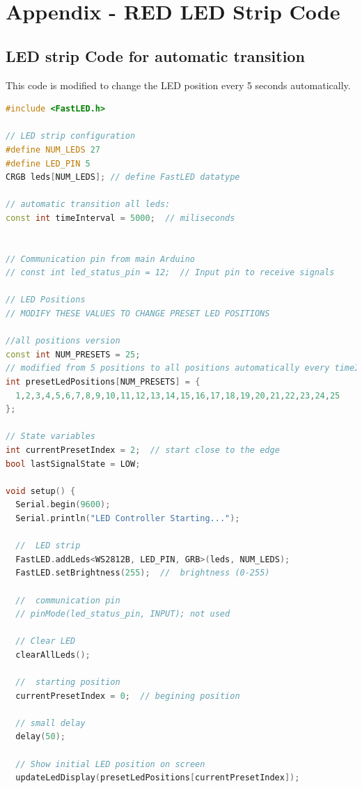 \section{Appendix - RED LED Strip Code}
\subsection{LED strip Code for automatic transition}
\label{RGBAppendix}
This code is modified to change the LED position every 5 seconds automatically.


\begin{lstlisting}[style=cstyle, caption=Cpp Code of the RGB strip with automatic changes, label=lst:RGBcodeAutomatic, language=c++ ]
    #include <FastLED.h>

// LED strip configuration
#define NUM_LEDS 27
#define LED_PIN 5
CRGB leds[NUM_LEDS]; // define FastLED datatype

// automatic transition all leds:
const int timeInterval = 5000;  // miliseconds


// Communication pin from main Arduino
// const int led_status_pin = 12;  // Input pin to receive signals

// LED Positions 
// MODIFY THESE VALUES TO CHANGE PRESET LED POSITIONS

//all positions version
const int NUM_PRESETS = 25;
// modified from 5 positions to all positions automatically every timeInterval seconds
int presetLedPositions[NUM_PRESETS] = {
  1,2,3,4,5,6,7,8,9,10,11,12,13,14,15,16,17,18,19,20,21,22,23,24,25   
};

// State variables
int currentPresetIndex = 2;  // start close to the edge
bool lastSignalState = LOW;

void setup() {
  Serial.begin(9600);
  Serial.println("LED Controller Starting...");
 
  //  LED strip
  FastLED.addLeds<WS2812B, LED_PIN, GRB>(leds, NUM_LEDS);
  FastLED.setBrightness(255);  //  brightness (0-255)
 
  //  communication pin
  // pinMode(led_status_pin, INPUT); not used
 
  // Clear LED
  clearAllLeds();
  
  //  starting position
  currentPresetIndex = 0;  // begining position 
  
  // small delay
  delay(50);
 
  // Show initial LED position on screen
  updateLedDisplay(presetLedPositions[currentPresetIndex]);
  

\end{lstlisting}
